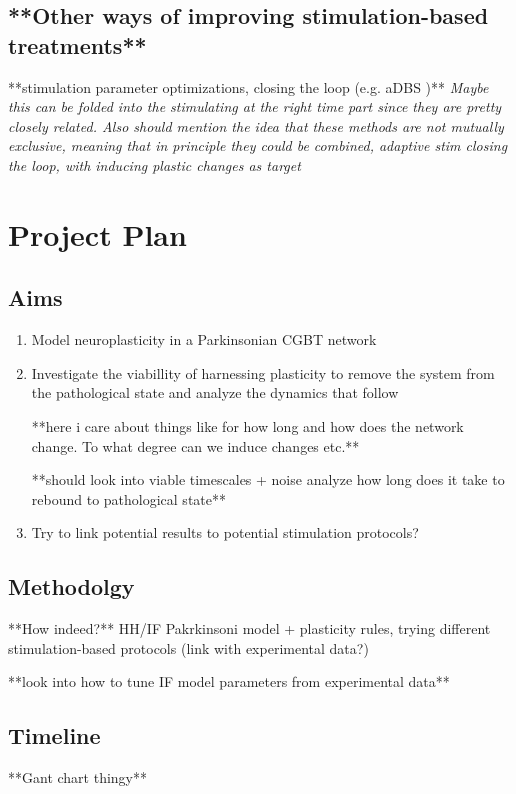 \subsection{**Other ways of improving stimulation-based treatments**}
**stimulation parameter optimizations, closing the loop (e.g. aDBS \cite{beudel2018adaptive})**
\textit{
	Maybe this can be folded into the stimulating at the right time part
	since they are pretty closely related. Also should mention the idea that
	these methods are not mutually exclusive, meaning that in principle they
	could be combined, adaptive stim closing the loop, with inducing plastic
	changes as target
}

\section{Project Plan}


\subsection{Aims}
\begin{enumerate}
	\item Model neuroplasticity in a Parkinsonian CGBT network
	\item Investigate the viabillity of harnessing plasticity to remove the
	      system from the pathological state and analyze the dynamics that follow

	      **here i care about things like for how long and how does the network change.
	      To what degree can we induce changes etc.**

	      **should look into viable timescales + noise analyze how long does it take to rebound to
	      pathological state**
	\item Try to link potential results to potential stimulation protocols?
\end{enumerate}

\subsection{Methodolgy} **How indeed?** HH/IF Pakrkinsoni model + plasticity rules, trying
different stimulation-based protocols (link with experimental data?)

**look into how to tune IF model parameters from experimental data**

\subsection{Timeline}
**Gant chart thingy**



